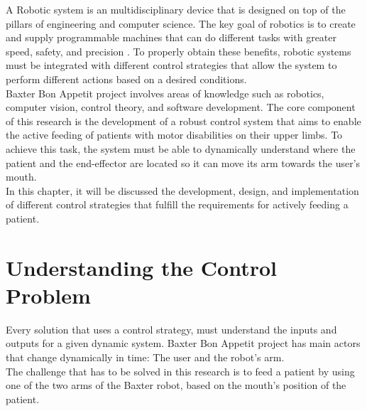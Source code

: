 \documentclass[11pt]{report} %
\begin{document}
A Robotic system is an multidisciplinary device that is designed on top of the pillars of  engineering and computer science. The key goal of robotics is to create and supply programmable machines that can do different tasks with greater speed, safety, and precision \citep{cite_towards_data_science}. To properly obtain these benefits, robotic systems must be integrated with different control strategies that allow the system to perform different actions based on a desired conditions.\\

Baxter Bon Appetit project involves areas of knowledge such as robotics, computer vision, control theory, and software development. The core component of this research is the development of a robust control system that aims to enable the active feeding of patients with motor disabilities on their upper limbs. To achieve this task, the system must be able to dynamically understand where the patient and the end-effector are located so it can move its arm towards the user's mouth.\\ 

In this chapter, it will be discussed the development, design, and implementation of different control strategies that fulfill the requirements for actively feeding a patient.\\

\section{Understanding the Control Problem}
Every solution that uses a control strategy, must understand the inputs and outputs for a given dynamic system. Baxter Bon Appetit project has main actors that change dynamically in time: The user and the robot's arm.\\

The challenge that has to be solved in this research is to feed a patient by using one of the two arms of the Baxter robot, based on the mouth's position of the patient.\\
\end{document}
